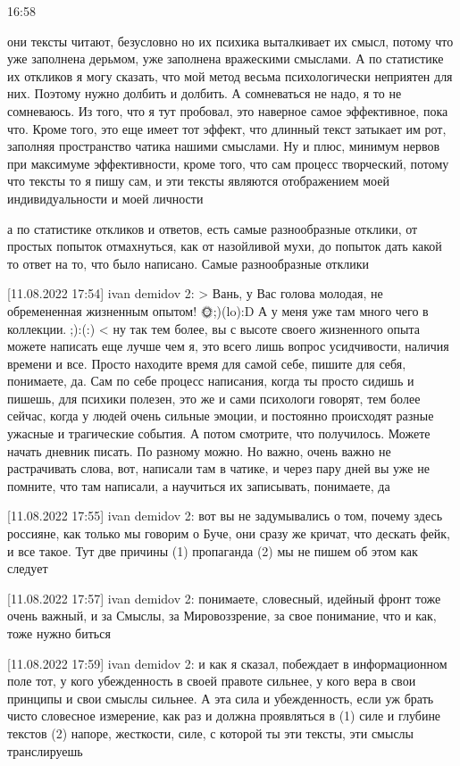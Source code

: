 16:58

они тексты читают, безусловно но их психика выталкивает их смысл, потому что
уже заполнена дерьмом, уже заполнена вражескими смыслами. А по статистике их
откликов я могу сказать, что мой метод весьма психологически неприятен для них.
Поэтому нужно долбить и долбить. А сомневаться не надо, я то не сомневаюсь. Из
того, что я тут пробовал, это наверное самое эффективное, пока что. Кроме того,
это еще имеет тот эффект, что длинный текст затыкает им рот, заполняя
пространство чатика нашими смыслами. Ну и плюс, минимум нервов при максимуме
эффективности, кроме того, что сам процесс творческий, потому что тексты то я
пишу сам, и эти тексты являются отображением моей индивидуальности и моей
личности

а по статистике откликов и ответов, есть самые разнообразные отклики, от
простых попыток отмахнуться, как от назойливой мухи, до попыток дать какой то
ответ на то, что было написано. Самые разнообразные отклики

[11.08.2022 17:54] ivan demidov 2: 
> Вань, у Вас голова молодая, не обремененная жизненным опытом! 🌞;)(lo):D А у меня уже там много чего в коллекции.🙈;):(:) <
ну так тем более, вы с высоте своего жизненного опыта можете написать еще лучше
чем я, это всего лишь вопрос усидчивости, наличия времени и все. Просто
находите время для самой себе, пишите для себя, понимаете, да. Сам по себе
процесс написания, когда ты просто сидишь и пишешь, для психики полезен, это же
и сами психологи говорят, тем более сейчас, когда у людей очень сильные эмоции,
и постоянно происходят разные ужасные и трагические события. А потом смотрите,
что получилось. Можете начать дневник писать. По разному можно. Но важно, очень
важно не растрачивать слова, вот, написали там в чатике, и через пару дней вы
уже не помните, что там написали, а научиться их записывать, понимаете, да

[11.08.2022 17:55] ivan demidov 2: вот вы не задумывались о том, почему здесь
россияне, как только мы говорим о Буче, они сразу же кричат, что дескать фейк,
и все такое. Тут две причины (1) пропаганда (2) мы не пишем об этом как следует

[11.08.2022 17:57] ivan demidov 2: понимаете, словесный, идейный фронт тоже
очень важный, и за Смыслы, за Мировоззрение, за свое понимание, что и как, тоже
нужно биться

[11.08.2022 17:59] ivan demidov 2: и как я сказал, побеждает в информационном
поле тот, у кого убежденность в своей правоте сильнее, у кого вера в свои
принципы и свои смыслы сильнее. А эта сила и убежденность, если уж брать чисто
словесное измерение, как раз и должна проявляться в (1) силе и глубине текстов
(2) напоре, жесткости, силе, с которой ты эти тексты, эти смыслы транслируешь

